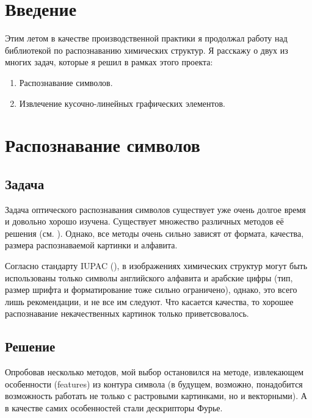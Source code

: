 





\renewcommand{\cftsecleader}{\cftdotfill{\cftsubsecdotsep}}
\tableofcontents

\pagebreak

\section{Введение}

Этим летом в качестве производственной практики я продолжал работу
над библиотекой по распознаванию химических структур. Я расскажу о двух из 
многих задач, которые я решил в рамках этого проекта:
\begin{enumerate}
\item Распознавание символов.
\item Извлечение кусочно-линейных графических элементов.
\end{enumerate}

\section{Распознавание символов}

\subsection{Задача}
Задача оптического распознавания символов существует уже очень долгое время и довольно 
хорошо изучена. Существует множество различных методов её решения (см. \cite{ocr}). Однако, 
все методы очень сильно зависят от формата, качества, размера распознаваемой 
картинки и алфавита.

Согласно стандарту IUPAC (\cite{iupac}), в изображениях химических структур могут быть 
использованы только символы английского алфавита и арабские цифры (тип, 
размер шрифта и форматирование тоже сильно ограничено), однако, это всего лишь 
рекомендации, и не все им следуют. Что касается качества, то хорошее 
распознавание некачественных картинок только приветсвовалось.

\subsection{Решение}
Опробовав несколько методов, мой выбор остановился на методе, извлекающем 
особенности (features) из контура символа (в будущем, возможно, понадобится 
возможность работать не только с растровыми картинками, но и векторными).
А в качестве самих особенностей стали дескрипторы Фурье.

